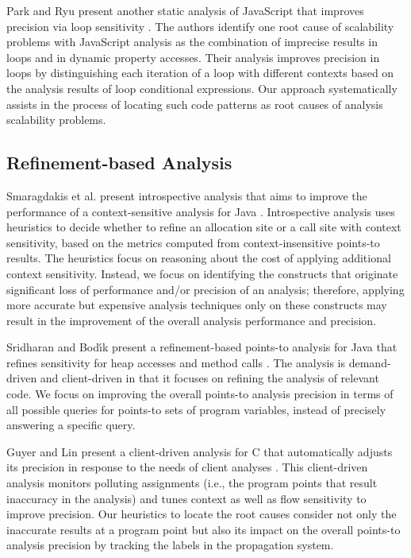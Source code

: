 Park and Ryu present another static analysis of JavaScript that improves precision via loop sensitivity \cite{DBLP:conf/ecoop/ParkR15}. The authors identify one root cause of scalability problems with JavaScript analysis as the combination of imprecise results in loops and in dynamic property accesses. Their analysis improves precision in loops by distinguishing each iteration of a loop with different contexts based on the analysis results of loop conditional expressions. Our approach systematically assists in the process of locating such code patterns as root causes of analysis scalability problems.


\subsection{Refinement-based Analysis}

Smaragdakis et al. present introspective analysis that aims to improve the performance of a context-sensitive analysis for Java \cite{Smaragdakis:2014:IAC:2594291.2594320}. Introspective analysis uses heuristics to decide whether to refine an allocation site or a call site with context sensitivity, based on the metrics computed from context-insensitive points-to results. The heuristics focus on reasoning about the cost of applying additional context sensitivity. Instead, we focus on identifying the constructs that originate significant loss of performance and/or precision of an analysis; therefore, applying more accurate but expensive analysis techniques only on these constructs may result in the improvement of the overall analysis performance and precision.

Sridharan and Bod\'{\i}k present a refinement-based points-to analysis for Java that refines sensitivity for heap accesses and method calls \cite{Sridharan:2006:RCP:1133981.1134027}. The analysis is demand-driven and client-driven in that it focuses on refining the analysis of relevant code. We focus on improving the overall points-to analysis precision in terms of all possible queries for points-to sets of program variables, instead of precisely answering a specific query.

Guyer and Lin present a client-driven analysis for C that automatically adjusts its precision in response to the needs of client analyses \cite{Guyer:2003:CPA:1760267.1760284}. This client-driven analysis monitors polluting assignments (i.e., the program points that result inaccuracy in the analysis) and tunes context as well as flow sensitivity to improve precision. Our heuristics to locate the root causes consider not only the inaccurate results at a program point but also its impact on the overall points-to analysis precision by tracking the labels in the propagation system. 